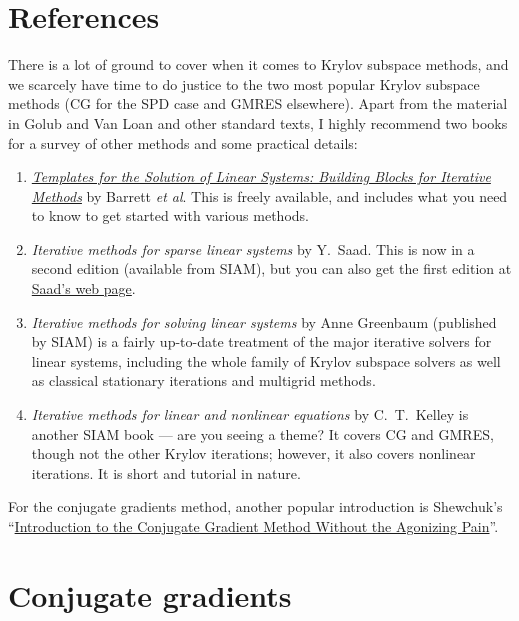 \documentclass[12pt, leqno]{article} %
\begin{document}

\section{References}

There is a lot of ground to cover when it comes to Krylov subspace
methods, and we scarcely have time to do justice to the two most popular
Krylov subspace methods (CG for the SPD case and GMRES elsewhere).
Apart from the material in Golub and Van Loan and other standard texts,
I highly recommend two books for a survey of other methods and some
practical details:
\begin{enumerate}
\item \href{http://www.netlib.org/templates/templates.pdf}{\em Templates for the Solution of Linear Systems:
Building Blocks for Iterative Methods}
  by Barrett {\em et al}.  This is freely available, and includes
  what you need to know to get started with various methods.
\item {\em Iterative methods for sparse linear systems} by Y.~Saad.
  This is now in a second edition (available from SIAM), but you
  can also get the first edition at \href{http://www-users.cs.umn.edu/~saad/books.html}{Saad's web page}.
\item {\em Iterative methods for solving linear systems} by Anne Greenbaum
  (published by SIAM) is a fairly up-to-date treatment of the major iterative
  solvers for linear systems, including the whole family of Krylov subspace
  solvers as well as classical stationary iterations and multigrid methods.
\item {\em Iterative methods for linear and nonlinear equations} by C.~T.~Kelley
  is another SIAM book --- are you seeing a theme?
  It covers CG and GMRES, though not the other
  Krylov iterations; however, it also covers nonlinear iterations.  It is
  short and tutorial in nature.
\end{enumerate}
For the conjugate gradients method, another popular introduction is
Shewchuk's ``\href{http://www.cs.cmu.edu/~quake-papers/painless-conjugate-gradient.pdf}{Introduction to the Conjugate Gradient Method Without the Agonizing Pain}''.


\section{Conjugate gradients}
\end{document}
